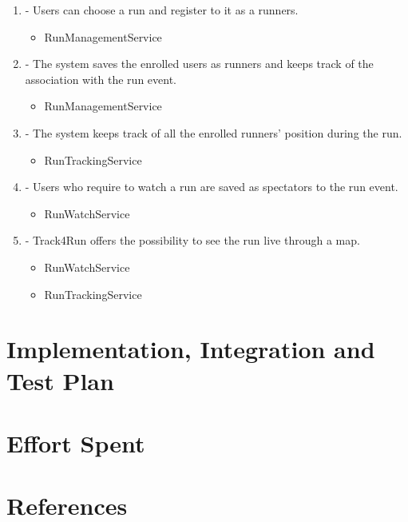 \documentclass[a4paper]{article}
\begin{document}
\begin{enumerate}[label*=\bf{R.\arabic*}]
\item - Users can choose a run and register to it as a runners.

\begin{itemize}
\item RunManagementService
\end{itemize}

\item - The system saves the enrolled users as runners and keeps track of the association with the run event.

\begin{itemize}
\item RunManagementService
\end{itemize}

\item - The system keeps track of all the enrolled runners’ position during the run.

\begin{itemize}
\item RunTrackingService
\end{itemize}

\item - Users who require to watch a run are saved as spectators to the run event.

\begin{itemize}
\item RunWatchService
\end{itemize}

\item - Track4Run offers the possibility to see the run live through a map.

\begin{itemize}
\item RunWatchService
\item RunTrackingService
\end{itemize}

\end{enumerate}

\section{Implementation, Integration and Test Plan}

\section{Effort Spent}

\section{References}
\end{document}
